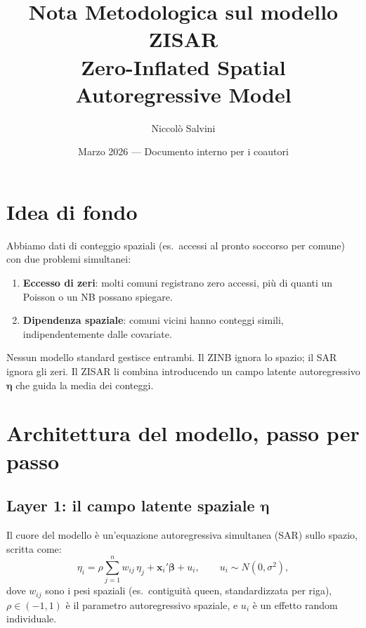 \documentclass[12pt,a4paper]{article}
\title{Nota Metodologica sul modello ZISAR\\[6pt]
\large Zero-Inflated Spatial Autoregressive Model}
\author{Niccol\`{o} Salvini}
\date{Marzo 2026 --- Documento interno per i coautori}
\begin{document}
\maketitle

\section{Idea di fondo}

Abbiamo dati di conteggio spaziali (es.\ accessi al pronto soccorso per comune) con due problemi simultanei:
\begin{enumerate}
  \item \textbf{Eccesso di zeri}: molti comuni registrano zero accessi, pi\`u di quanti un Poisson o un NB possano spiegare.
  \item \textbf{Dipendenza spaziale}: comuni vicini hanno conteggi simili, indipendentemente dalle covariate.
\end{enumerate}
Nessun modello standard gestisce entrambi. Il ZINB ignora lo spazio; il SAR ignora gli zeri.
Il ZISAR li combina introducendo un campo latente autoregressivo $\boldsymbol{\eta}$ che guida la media dei conteggi.

\section{Architettura del modello, passo per passo}

\subsection{Layer 1: il campo latente spaziale \texorpdfstring{$\boldsymbol{\eta}$}{eta}}

Il cuore del modello \`e un'equazione autoregressiva simultanea (SAR) sullo spazio, scritta come:
\begin{equation}\label{eq:sar}
  \eta_i = \rho \sum_{j=1}^{n} w_{ij}\,\eta_j + \mathbf{x}_i'\boldsymbol{\beta} + u_i,
  \qquad u_i \sim N(0, \sigma^2),
\end{equation}
dove $w_{ij}$ sono i pesi spaziali (es.\ contiguit\`a queen, standardizzata per riga), $\rho \in (-1,1)$ \`e il parametro autoregressivo spaziale, e $u_i$ \`e un effetto random individuale.
\end{document}

